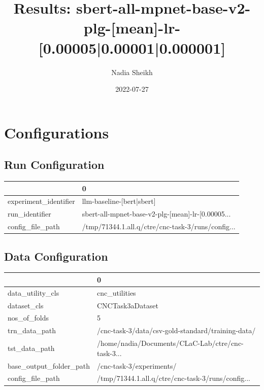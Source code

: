 \documentclass{article}
\title{Results: sbert-all-mpnet-base-v2-plg-[mean]-lr-[0.00005|0.00001|0.000001]}
\author{Nadia Sheikh}
\date{2022-07-27}
\begin{document}
\maketitle
\section{Configurations}
\subsection{Run Configuration}
\begin{tabular}{ll}
\toprule
{} &                                                  0 \\
\midrule
experiment\_identifier &                          llm-baseline-[bert|sbert] \\
run\_identifier        &  sbert-all-mpnet-base-v2-plg-[mean]-lr-[0.00005... \\
config\_file\_path      &  /tmp/71344.1.all.q/ctre/cnc-task-3/runs/config... \\
\bottomrule
\end{tabular}

\subsection{Data Configuration}
\begin{tabular}{ll}
\toprule
{} &                                                  0 \\
\midrule
data\_utility\_cls        &                                      cnc\_utilities \\
dataset\_cls             &                                   CNCTask3aDataset \\
nos\_of\_folds            &                                                  5 \\
trn\_data\_path           &  /cnc-task-3/data/csv-gold-standard/training-data/ \\
tst\_data\_path           &  /home/nadia/Documents/CLaC-Lab/ctre/cnc-task-3... \\
base\_output\_folder\_path &                           /cnc-task-3/experiments/ \\
config\_file\_path        &  /tmp/71344.1.all.q/ctre/cnc-task-3/runs/config... \\
\bottomrule
\end{tabular}
\end{document}

